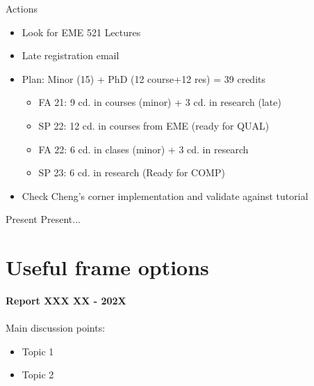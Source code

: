 \documentclass{beamer}
\begin{document}
	\begin{frame}{Actions}
		\begin{itemize}
			\item Look for EME 521 Lectures
			\item Late registration email
			\item Plan: Minor (15) + PhD (12 course+12 res) = 39 credits
			\begin{itemize}
				\item FA 21: 9 cd. in courses (minor) + 3 cd. in research (late)
				\item SP 22: 12 cd. in courses from EME (ready for QUAL)
				\item FA 22: 6 cd. in clases (minor) + 3 cd. in research
				\item SP 23: 6 cd. in research (Ready for COMP)
			\end{itemize}
			\item Check Cheng's corner implementation and validate against tutorial
		\end{itemize}
	\end{frame}

	
	\begin{frame}{Present}
		Present...
	\end{frame}
	
	\section*{Useful frame options}
	\begin{frame}
		\textbf{Report XXX XX - 202X}\\~\\
		Main discussion points:
		\begin{itemize}
			\item Topic 1
			\item Topic 2
		\end{itemize}
	\end{frame}
\end{document}
